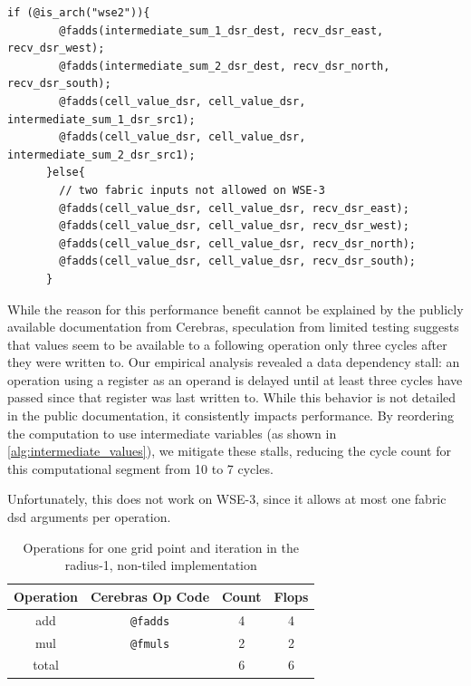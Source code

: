 
\begin{lstlisting}[language=CSL, caption={CSL code for the single-cell implementation}, label={lst:single_cell_implementation}]
    if (@is_arch("wse2")){
        @fadds(intermediate_sum_1_dsr_dest, recv_dsr_east, recv_dsr_west);
        @fadds(intermediate_sum_2_dsr_dest, recv_dsr_north, recv_dsr_south);
        @fadds(cell_value_dsr, cell_value_dsr, intermediate_sum_1_dsr_src1);
        @fadds(cell_value_dsr, cell_value_dsr, intermediate_sum_2_dsr_src1);
      }else{
        // two fabric inputs not allowed on WSE-3
        @fadds(cell_value_dsr, cell_value_dsr, recv_dsr_east);
        @fadds(cell_value_dsr, cell_value_dsr, recv_dsr_west);
        @fadds(cell_value_dsr, cell_value_dsr, recv_dsr_north);
        @fadds(cell_value_dsr, cell_value_dsr, recv_dsr_south);
      }
\end{lstlisting}


While the reason for this performance benefit cannot be explained by the publicly available documentation from Cerebras, speculation from limited testing suggests that values seem to be available to a following operation only three cycles after they were written to.
Our empirical analysis revealed a data dependency stall: an operation using a register as an operand is delayed until at least three cycles have passed since that register was last written to. While this behavior is not detailed in the public documentation, it consistently impacts performance. By reordering the computation to use intermediate variables (as shown in \autoref{alg:intermediate_values}), we mitigate these stalls, reducing the cycle count for this computational segment from 10 to 7 cycles.

Unfortunately, this does not work on WSE-3, since it allows at most one fabric \ac{dsd} arguments per operation.

\begin{table}[h]
    \centering
    \caption{Operations for one grid point and iteration in the radius-1, non-tiled implementation}
    \label{tab:r1_non_tiled_operations}
    \begin{tabular}{@{}cccc@{}}
        \toprule
        Operation & Cerebras Op Code & Count & Flops \\
        \midrule
        add & \texttt{@fadds} & \num{4} & \num{4} \\
        mul & \texttt{@fmuls} & \num{2} & \num{2} \\
        \midrule
        total & & \num{6} & \num{6} \\
        \bottomrule
    \end{tabular}
\end{table}

